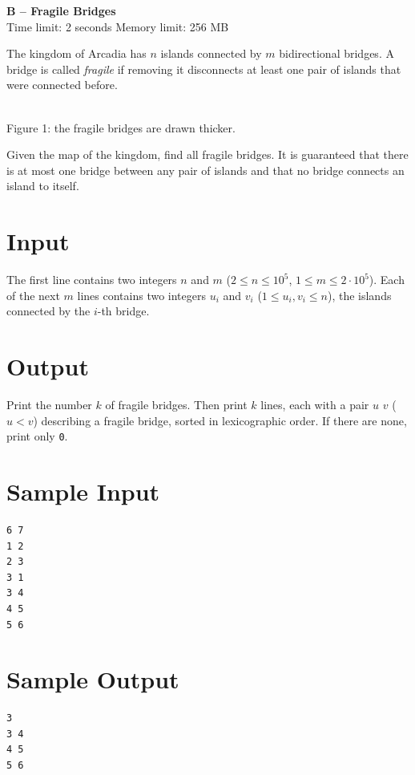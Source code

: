 \documentclass[11pt]{article}
\begin{document}
\begin{center}{\Large\bf B -- Fragile Bridges}\\[2pt]{\small Time limit: 2 seconds \quad Memory limit: 256 MB}\end{center}

The kingdom of Arcadia has $n$ islands connected by $m$ bidirectional bridges. A bridge is called
\emph{fragile} if removing it disconnects at least one pair of islands that were connected before.

\begin{center}
\\[2pt]
{\small Figure 1: the fragile bridges are drawn thicker.}
\end{center}

Given the map of the kingdom, find all fragile bridges. It is guaranteed that there is at most one
bridge between any pair of islands and that no bridge connects an island to itself.

\section*{Input}
The first line contains two integers $n$ and $m$ ($2 \le n \le 10^5$, $1 \le m \le 2 \cdot 10^5$).
Each of the next $m$ lines contains two integers $u_i$ and $v_i$ ($1 \le u_i, v_i \le n$), the islands
connected by the $i$-th bridge.

\section*{Output}
Print the number $k$ of fragile bridges. Then print $k$ lines, each with a pair $u$ $v$ ($u < v$)
describing a fragile bridge, sorted in lexicographic order. If there are none, print only \texttt{0}.

\section*{Sample Input}
\begin{verbatim}
6 7
1 2
2 3
3 1
3 4
4 5
5 6
\end{verbatim}

\section*{Sample Output}
\begin{verbatim}
3
3 4
4 5
5 6
\end{verbatim}
\end{document}

